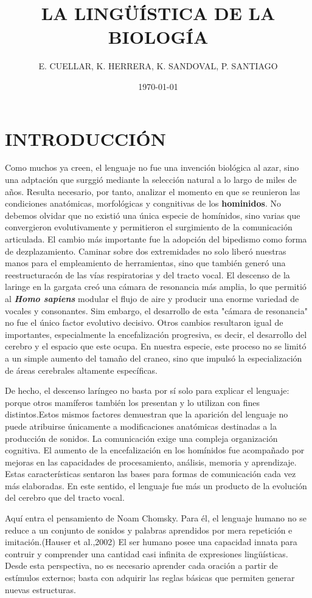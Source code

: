 \documentclass[12pt]{article}
\title{LA LINGÜÍSTICA DE LA BIOLOGÍA}
\author{E. CUELLAR, K. HERRERA, K. SANDOVAL, P. SANTIAGO}
\date{\today}
\begin{document}
\maketitle

\section{INTRODUCCIÓN}
Como muchos ya creen, el lenguaje no fue una invención biológica al azar, sino una adptación que surggió mediante la selección natural a lo largo de miles de años. Resulta necesario, por tanto, analizar el momento en que se reunieron las condiciones anatómicas, morfológicas y congnitivas de los \textbf{hominidos}. No debemos olvidar que no existió una única especie de homínidos, sino varias que convergieron evolutivamente y permitieron el surgimiento de la comunicación articulada.
El cambio más importante fue la adopción del bipedismo como forma de dezplazamiento. Caminar sobre dos extremidades no solo liberó nuestras manos para el empleamiento de herramientas, sino que también generó una reestructuracón de las vías respiratorias y del tracto vocal. El descenso de la laringe en la gargata creó una cámara de resonancia más amplia, lo que permitió al \textbf{\textit{Homo sapiens}} modular el flujo de aire y producir una enorme variedad de vocales y consonantes.
Sim embargo, el desarrollo de esta "cámara de resonancia" no fue el único factor evolutivo decisivo. Otros cambios resultaron igual de importantes, especialmente la encefalización progresiva, es decir, el desarrollo del cerebro y el espacio que este ocupa. En nuestra especie, este proceso no se limitó a un simple aumento del tamaño del craneo, sino que impulsó la especialización de áreas cerebrales altamente específicas. 

De hecho, el descenso laríngeo no basta por sí solo para explicar el lenguaje: porque otros mamíferos también los presentan y lo utilizan con fines distintos.Estos mismos factores demuestran que la aparición del lenguaje no puede atribuirse únicamente a modificaciones anatómicas destinadas a la producción de sonidos. La comunicación exige una compleja organización cognitiva. El aumento de la encefalización en los homínidos fue acompañado por mejoras en las capacidades de procesamiento, análisis, memoria y aprendizaje. Estas características sentaron las bases para formas de comunicación cada vez más elaboradas. En este sentido, el lenguaje fue más un producto de la evolución del cerebro que del tracto vocal. 

Aquí entra el pensamiento de Noam Chomsky. Para él, el lenguaje humano no se reduce a un conjunto de sonidos y palabras aprendidos por mera repetición e imitación.(Hauser et al.,2002) El ser humano posee una capacidad innata para contruir y comprender una cantidad casi infinita de expresiones lingüísticas. Desde esta perspectiva, no es necesario aprender cada oración a partir de estímulos externos; basta con adquirir las reglas básicas que permiten generar nuevas estructuras. 
\end{document}
